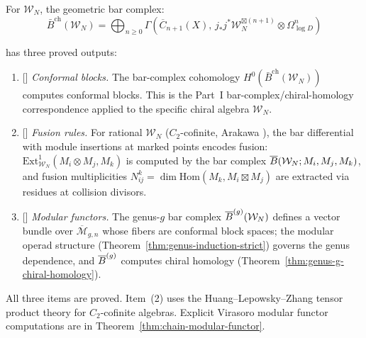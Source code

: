 \begin{theorem}
\label{thm:w-algebra-bar-complex}
For $\mathcal{W}_N$, the geometric bar complex:
\[\bar{B}^{\text{ch}}(\mathcal{W}_N) =
\bigoplus_{n \geq 0} \Gamma\!\left(\overline{C}_{n+1}(X),\,
  j_*j^*\mathcal{W}_N^{\boxtimes(n+1)} \otimes \Omega^n_{\log D}\right)\]

has three proved outputs:
\begin{enumerate}
\item \textup{[\ClaimStatusProvedHere]}
\emph{Conformal blocks.}
The bar-complex cohomology
$H^0(\bar{B}^{\mathrm{ch}}(\mathcal{W}_N))$ computes conformal blocks.
This is the Part~I bar-complex/chiral-homology correspondence applied
to the specific chiral algebra $\mathcal{W}_N$.

\item \textup{[\ClaimStatusProvedHere]}
\emph{Fusion rules.} For rational $\mathcal{W}_N$
\textup{(}$C_2$-cofinite, Arakawa \cite{Ara07}\textup{)},
the bar differential with module insertions at marked
points encodes fusion: $\mathrm{Ext}^1_{\mathcal{W}_N}(M_i
\otimes M_j, M_k)$ is computed by the bar complex
$\overline{B}(\mathcal{W}_N; M_i, M_j, M_k)$, and fusion
multiplicities $N_{ij}^k = \dim
\mathrm{Hom}(M_k, M_i \boxtimes M_j)$ are extracted via
residues at collision divisors.

\item \textup{[\ClaimStatusProvedHere]}
\emph{Modular functors.} The genus-$g$ bar complex
$\overline{B}^{(g)}(\mathcal{W}_N)$ defines a vector bundle
over $\overline{\mathcal{M}}_{g,n}$ whose fibers are
conformal block spaces; the modular operad structure
\textup{(}Theorem~\textup{\ref{thm:genus-induction-strict})}
governs the genus dependence, and
$\overline{B}^{(g)}$ computes chiral homology
\textup{(}Theorem~\textup{\ref{thm:genus-g-chiral-homology})}.
\end{enumerate}
\end{theorem}

\begin{remark}[Scope]
All three items are proved.  Item~(2) uses the Huang--Lepowsky--Zhang tensor product theory \cite{HLZ} for $C_2$-cofinite algebras.  Explicit Virasoro modular functor computations are in Theorem~\ref{thm:chain-modular-functor}.
\end{remark}

